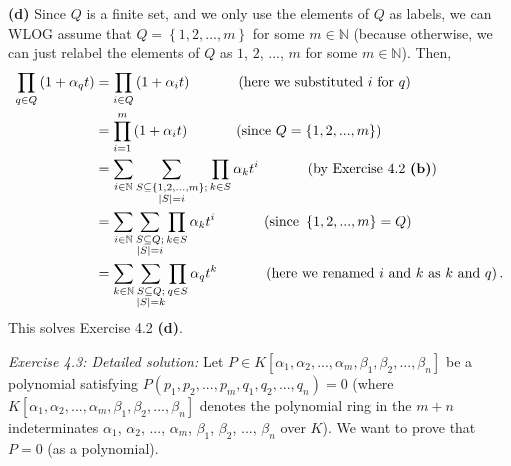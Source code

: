 \documentclass[numbers=enddot,12pt,final,onecolumn,notitlepage]{scrartcl}%
\begin{document}
\textbf{(d)} Since $Q$ is a finite set, and we only use the elements of $Q$ as
labels, we can WLOG assume that $Q=\left\{  1,2,...,m\right\}  $ for some
$m\in\mathbb{N}$ (because otherwise, we can just relabel the elements of $Q$
as $1$, $2$, $...$, $m$ for some $m\in\mathbb{N}$). Then,
\begin{align*}
\prod\limits_{q\in Q}\left(  1+\alpha_{q}t\right)   &  =\prod\limits_{i\in
Q}\left(  1+\alpha_{i}t\right)  \ \ \ \ \ \ \ \ \ \ \left(  \text{here we
substituted }i\text{ for }q\right) \\
&  =\prod\limits_{i=1}^{m}\left(  1+\alpha_{i}t\right)
\ \ \ \ \ \ \ \ \ \ \left(  \text{since }Q=\left\{  1,2,...,m\right\}  \right)
\\
&  =\sum\limits_{i\in\mathbb{N}}\sum\limits_{\substack{S\subseteq\left\{
1,2,...,m\right\}  ;\\\left\vert S\right\vert =i}}\prod\limits_{k\in S}%
\alpha_{k}t^{i}\ \ \ \ \ \ \ \ \ \ \left(  \text{by Exercise 4.2 \textbf{(b)}%
}\right) \\
&  =\sum\limits_{i\in\mathbb{N}}\sum\limits_{\substack{S\subseteq
Q;\\\left\vert S\right\vert =i}}\prod\limits_{k\in S}\alpha_{k}t^{i}%
\ \ \ \ \ \ \ \ \ \ \left(  \text{since }\left\{  1,2,...,m\right\}  =Q\right)
\\
&  =\sum\limits_{k\in\mathbb{N}}\sum\limits_{\substack{S\subseteq
Q;\\\left\vert S\right\vert =k}}\prod\limits_{q\in S}\alpha_{q}t^{k}%
\ \ \ \ \ \ \ \ \ \ \left(  \text{here we renamed }i\text{ and }k\text{ as
}k\text{ and }q\right)  .
\end{align*}
This solves Exercise 4.2 \textbf{(d)}.

\textit{Exercise 4.3: Detailed solution:} Let $P\in K\left[  \alpha_{1}%
,\alpha_{2},...,\alpha_{m},\beta_{1},\beta_{2},...,\beta_{n}\right]  $ be a
polynomial satisfying $P\left(  p_{1},p_{2},...,p_{m},q_{1},q_{2}%
,...,q_{n}\right)  =0$ (where $K\left[  \alpha_{1},\alpha_{2},...,\alpha
_{m},\beta_{1},\beta_{2},...,\beta_{n}\right]  $ denotes the polynomial ring
in the $m+n$ indeterminates $\alpha_{1}$, $\alpha_{2}$, $...$, $\alpha_{m}$,
$\beta_{1}$, $\beta_{2}$, $...$, $\beta_{n}$ over $K$). We want to prove that
$P=0$ (as a polynomial).
\end{document}
